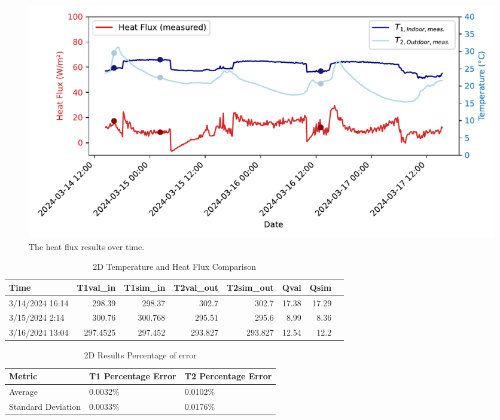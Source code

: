 \begin{figure}[htb]
     \centering
    \includegraphics[width=1\linewidth]{Figures/Validation}
     \caption[Experimental Report Plot]{The heat flux results over time.}
   \label{fig:expr}
 \end{figure}


\begin{table}[tbh]
    \caption{2D Temperature and Heat Flux Comparison}
    \label{table2d}
    \centering
    \begin{tabular}{lrrrrrrr}
        \toprule
        Time                & T1val\_in & T1sim\_in & T2val\_out & T2sim\_out & Qval & Qsim \\
        \midrule
        3/14/2024 16:14 & 298.39    & 298.37    & 302.7     & 302.7     & 17.38 & 17.29 \\
        3/15/2024 2:14  & 300.76    & 300.768   & 295.51    & 295.6     & 8.99  & 8.36  \\
        3/16/2024 13:04 & 297.4525  & 297.452   & 293.827   & 293.827   & 12.54 & 12.2  \\
        \bottomrule
    \end{tabular}
\end{table}

\begin{table}[]
 \caption{2D Results Percentage of error}
    \label{error2d}
     \centering
 \begin{tabular}{l l l}
        \toprule
        Metric & T1 Percentage Error & T2 Percentage Error \\
        \midrule
        Average & 0.0032\% & 0.0102\% \\
        Standard Deviation & 0.0033\% & 0.0176\% \\
        \bottomrule
    \end{tabular}
\end{table}


